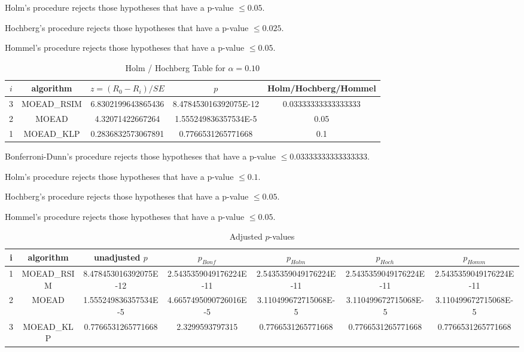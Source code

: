 \documentclass[a4paper,10pt]{article}
\begin{document}
\begin{landscape}
Holm's procedure rejects those hypotheses that have a p-value $\le0.05$.


Hochberg's procedure rejects those hypotheses that have a p-value $\le0.025$.


Hommel's procedure rejects those hypotheses that have a p-value $\le0.05$.


\begin{table}[!htp]
\centering\tiny
\caption{Holm / Hochberg Table for $\alpha=0.10$}
\begin{tabular}{ccccc}
$i$&algorithm&$z=(R_0 - R_i)/SE$&$p$&Holm/Hochberg/Hommel\\
\hline
3&MOEAD_RSIM&6.8302199643865436&8.478453016392075E-12&0.03333333333333333\\
2&MOEAD&4.32071422667264&1.555249836357534E-5&0.05\\
1&MOEAD_KLP&0.2836832573067891&0.7766531265771668&0.1\\
\hline
\end{tabular}
\end{table}
Bonferroni-Dunn's procedure rejects those hypotheses that have a p-value $\le0.03333333333333333$.


Holm's procedure rejects those hypotheses that have a p-value $\le0.1$.


Hochberg's procedure rejects those hypotheses that have a p-value $\le0.05$.


Hommel's procedure rejects those hypotheses that have a p-value $\le0.05$.


\begin{table}[!htp]
\centering\tiny
\caption{Adjusted $p$-values}
\begin{tabular}{ccccccc}
i&algorithm&unadjusted $p$&$p_{Bonf}$&$p_{Holm}$&$p_{Hoch}$&$p_{Homm}$\\
\hline
1&MOEAD_RSIM&8.478453016392075E-12&2.5435359049176224E-11&2.5435359049176224E-11&2.5435359049176224E-11&2.5435359049176224E-11\\
2&MOEAD&1.555249836357534E-5&4.6657495090726016E-5&3.110499672715068E-5&3.110499672715068E-5&3.110499672715068E-5\\
3&MOEAD_KLP&0.7766531265771668&2.3299593797315&0.7766531265771668&0.7766531265771668&0.7766531265771668\\
\hline
\end{tabular}
\end{table}


\end{landscape}
\end{document}
